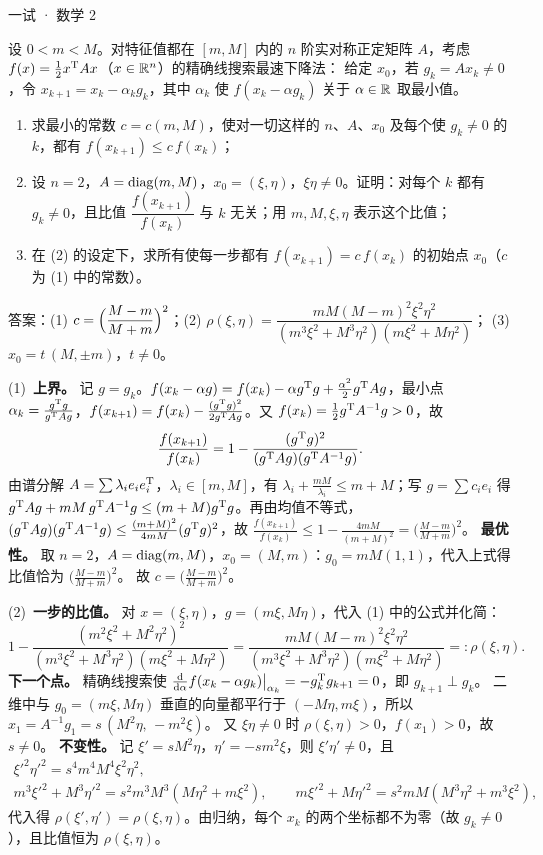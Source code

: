 \documentclass[cjk=noto, seal=first]{mojing-exam}
\begin{document}
\begin{paper}[time={建议 3 小时（训练设置）}, full=150]{一试 · 数学 2}
\begin{questions}
\question[30]
设 $0<m<M$。对特征值都在 $[m,M]$ 内的 $n$ 阶实对称正定矩阵 $A$，考虑 $f(x)=\frac12x^{\mathrm{T}} Ax$（$x\in\mathbb{R}^n$）的精确线搜索最速下降法：
给定 $x_0$，若 $g_k=Ax_k\ne0$，令 $x_{k+1}=x_k-\alpha_kg_k$，其中 $\alpha_k$ 使 $f(x_k-\alpha g_k)$ 关于 $\alpha\in\mathbb{R}$ 取最小值。
\begin{enumerate}
  \item 求最小的常数 $c=c(m,M)$，使对一切这样的 $n$、$A$、$x_0$ 及每个使 $g_k\ne0$ 的 $k$，都有 $f(x_{k+1})\le c\,f(x_k)$；
  \item 设 $n=2$，$A=\operatorname{diag}(m,M)$，$x_0=(\xi,\eta)$，$\xi\eta\ne0$。证明：对每个 $k$ 都有 $g_k\ne0$，且比值 $\dfrac{f(x_{k+1})}{f(x_k)}$
        与 $k$ 无关；用 $m,M,\xi,\eta$ 表示这个比值；
  \item 在 (2) 的设定下，求所有使每一步都有 $f(x_{k+1})=c\,f(x_k)$ 的初始点 $x_0$（$c$ 为 (1) 中的常数）。
\end{enumerate}
\answerspace{2cm}
\begin{solution}
答案：(1) $c=\Bigl(\dfrac{M-m}{M+m}\Bigr)^2$；(2) $\rho(\xi,\eta)=\dfrac{mM(M-m)^2\xi^2\eta^2}{(m^3\xi^2+M^3\eta^2)(m\xi^2+M\eta^2)}$；
(3) $x_0=t\,(M,\pm m)$，$t\ne0$。

(1)~\textbf{上界。} 记 $g=g_k$。$f(x_k-\alpha g)=f(x_k)-\alpha g^{\mathrm{T}} g+\frac{\alpha^2}2g^{\mathrm{T}} Ag$，最小点
$\alpha_k=\frac{g^{\mathrm{T}} g}{g^{\mathrm{T}} Ag}$，$f(x_{k+1})=f(x_k)-\frac{(g^{\mathrm{T}} g)^2}{2g^{\mathrm{T}} Ag}$。又 $f(x_k)=\frac12g^{\mathrm{T}} A^{-1}g>0$，故
\[
  \frac{f(x_{k+1})}{f(x_k)}=1-\frac{(g^{\mathrm{T}} g)^2}{(g^{\mathrm{T}} Ag)(g^{\mathrm{T}} A^{-1}g)} .
\]
由谱分解 $A=\sum\lambda_ie_ie_i^{\mathrm{T}}$，$\lambda_i\in[m,M]$，有 $\lambda_i+\frac{mM}{\lambda_i}\le m+M$；写 $g=\sum c_ie_i$ 得
$g^{\mathrm{T}} Ag+mM\,g^{\mathrm{T}} A^{-1}g\le(m+M)g^{\mathrm{T}} g$。再由均值不等式，$(g^{\mathrm{T}} Ag)(g^{\mathrm{T}} A^{-1}g)\le\frac{(m+M)^2}{4mM}(g^{\mathrm{T}} g)^2$，故
$\frac{f(x_{k+1})}{f(x_k)}\le1-\frac{4mM}{(m+M)^2}=\bigl(\frac{M-m}{M+m}\bigr)^2$。
\textbf{最优性。} 取 $n=2$，$A=\operatorname{diag}(m,M)$，$x_0=(M,m)$：$g_0=mM(1,1)$，代入上式得比值恰为 $\bigl(\frac{M-m}{M+m}\bigr)^2$。
故 $c=\bigl(\frac{M-m}{M+m}\bigr)^2$。

(2)~\textbf{一步的比值。} 对 $x=(\xi,\eta)$，$g=(m\xi,M\eta)$，代入 (1) 中的公式并化简：
\[
  1-\frac{(m^2\xi^2+M^2\eta^2)^2}{(m^3\xi^2+M^3\eta^2)(m\xi^2+M\eta^2)}=\frac{mM(M-m)^2\xi^2\eta^2}{(m^3\xi^2+M^3\eta^2)(m\xi^2+M\eta^2)}=:\rho(\xi,\eta).
\]
\textbf{下一个点。} 精确线搜索使 $\frac{\mathop{}\!\mathrm{d}}{\mathop{}\!\mathrm{d}\alpha}f(x_k-\alpha g_k)\big|_{\alpha_k}=-g_k^{\mathrm{T}} g_{k+1}=0$，即 $g_{k+1}\perp g_k$。
二维中与 $g_0=(m\xi,M\eta)$ 垂直的向量都平行于 $(-M\eta,m\xi)$，所以 $x_1=A^{-1}g_1=s\,(M^2\eta,\,-m^2\xi)$。
又 $\xi\eta\ne0$ 时 $\rho(\xi,\eta)>0$，$f(x_1)>0$，故 $s\ne0$。
\textbf{不变性。} 记 $\xi'=sM^2\eta$，$\eta'=-sm^2\xi$，则 $\xi'\eta'\ne0$，且
\begin{gather*}
  \xi'^2\eta'^2=s^4m^4M^4\xi^2\eta^2,\\
  m^3\xi'^2+M^3\eta'^2=s^2m^3M^3(M\eta^2+m\xi^2),\qquad m\xi'^2+M\eta'^2=s^2mM(M^3\eta^2+m^3\xi^2),
\end{gather*}
代入得 $\rho(\xi',\eta')=\rho(\xi,\eta)$。由归纳，每个 $x_k$ 的两个坐标都不为零（故 $g_k\ne0$），且比值恒为 $\rho(\xi,\eta)$。


\end{solution}
\end{questions}
\end{paper}
\end{document}
